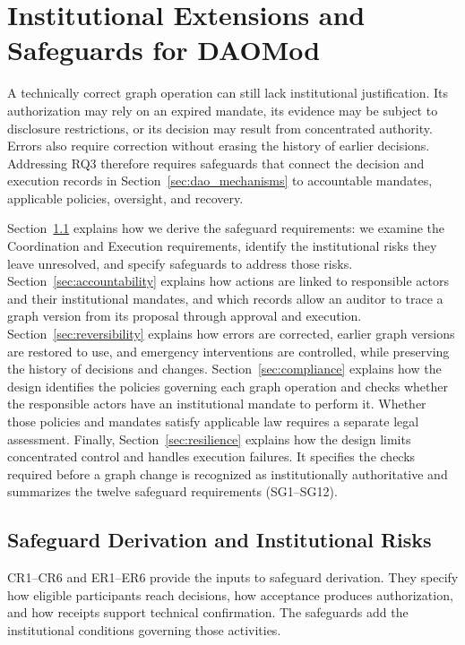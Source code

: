 \documentclass[journal]{IEEEtran}
\begin{document}
\section{Institutional Extensions and Safeguards for DAOMod}
\label{sec:safeguards}

A technically correct graph operation can still lack institutional
justification. Its authorization may rely on an expired mandate,
its evidence may be subject to disclosure restrictions, or its
decision may result from concentrated authority. Errors also
require correction without erasing the history of earlier
decisions. Addressing RQ3 therefore requires safeguards that
connect the decision and execution records in
Section~\ref{sec:dao_mechanisms} to accountable mandates,
applicable policies, oversight, and recovery.

Section~\ref{sec:safeguard_inputs} explains how we derive
the safeguard requirements: we examine the Coordination
and Execution requirements, identify the institutional risks
they leave unresolved, and specify safeguards to address
those risks. Section~\ref{sec:accountability} explains how actions are
linked to responsible actors and their institutional mandates,
and which records allow an auditor to trace a graph version
from its proposal through approval and execution.
Section~\ref{sec:reversibility} explains how errors are
corrected, earlier graph versions are restored to use,
and emergency interventions are controlled, while preserving
the history of decisions and changes.
Section~\ref{sec:compliance} explains how the design identifies
the policies governing each graph operation and checks whether
the responsible actors have an institutional mandate to
perform it. Whether those policies and mandates satisfy
applicable law requires a separate legal assessment.
Finally, Section~\ref{sec:resilience} explains how the design
limits concentrated control and handles execution failures.
It specifies the checks required before a graph change is
recognized as institutionally authoritative and summarizes
the twelve safeguard requirements (SG1--SG12).

\subsection{Safeguard Derivation and Institutional Risks}
\label{sec:safeguard_inputs}

CR1--CR6 and ER1--ER6 provide the inputs to safeguard derivation.
They specify how eligible participants reach decisions,
how acceptance produces authorization, and how receipts
support technical confirmation. The safeguards add the
institutional conditions governing those activities.
\end{document}
